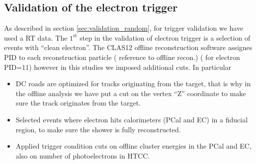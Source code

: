 \subsection{Validation of the electron trigger}
As described in section \ref{sec:validation_random}, for trigger validation we have used a RT data. 
The $\mathrm{1^{st}}$ step in the validation of electron trigger is a selection of  events with ``clean electron''. The CLAS12 offline reconstruction software assignes PID to each reconstruction particle ({\color{Red} reference to offline recon.}) ( for electron PID=11) however in this studies we imposed additional cuts. 
In particular 
\begin{itemize}
 \item DC roads are optimized for tracks originating from the target, that is why in the offline analysis we have put a cut on the vertex ``Z'' coordinate to make sure the track originates from the target.
 \item Selected events where electron hits calorimeters (PCal and EC) in a fiducial region, to make sure the shower is fully reconstructed.
 \item Applied trigger condition cuts on offline cluster energies in the PCal and EC, also on number of photoelectrons in HTCC.
\end{itemize}



